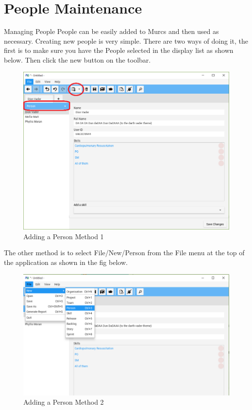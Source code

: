 \section{People Maintenance}

Managing People
\newline\newline
People can be easily added to Murcs and then used as necessary. 
\newline
Creating new people is very simple. There are two ways of doing it, the first is to make sure you have the People selected in the display list as shown below. Then click the new button on the toolbar.

\begin{figure}[H]
\centering
\includegraphics[width=\textwidth]{images/screenshots/people1.PNG}
\caption{Adding a Person Method 1}
\label{fig:new_project}
\end{figure}

The other method is to select File/New/Person from the File menu at the top of the application as shown in the fig below.

\begin{figure}[H]
\centering
\includegraphics[width=\textwidth]{images/screenshots/people4.PNG}
\caption{Adding a Person Method 2}
\label{fig:new_project}
\end{figure}

